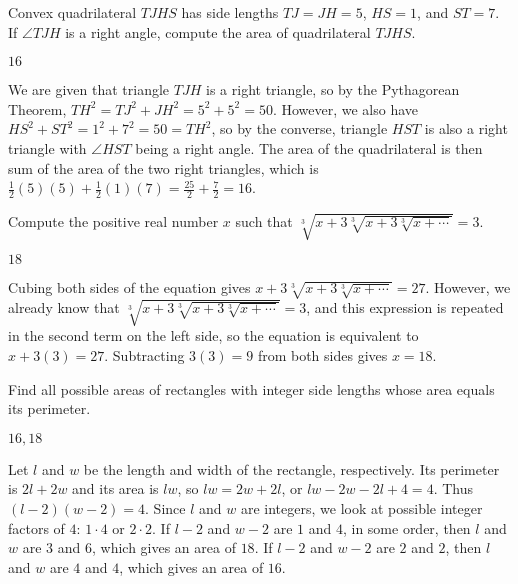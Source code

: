 \documentclass[11pt]{article}
\begin{document}
\begin{problem}%
Convex quadrilateral $TJHS$ has side lengths $TJ = JH = 5$, $HS = 1$, and $ST = 7$. If $\angle TJH$ is a right
angle, compute the area of quadrilateral $TJHS$.
\end{problem}

\begin{answer}
$\boxed{16}$
\end{answer}

\begin{solution}
We are given that triangle $TJH$ is a right triangle, so by the Pythagorean Theorem, 
$TH^2 = TJ^2 + JH^2 = 5^2 + 5^2 = 50$. However, we also have $HS^2 + ST^2 = 1^2 + 7^2 = 50 = TH^2$, 
so by the converse, triangle $HST$ is also a right triangle with $\angle HST$ being a right angle. 
The area of the quadrilateral is then sum of the area of the two right triangles, 
which is $\frac{1}{2}(5)(5) + \frac{1}{2}(1)(7) = \frac{25}{2} + \frac{7}{2} = \boxed{16}$.
\end{solution}


\begin{problem}%
Compute the positive real number $x$ such that $\sqrt[3]{x + 3\sqrt[3]{x + 3\sqrt[3]{x + \cdots}}} = 3$.
\end{problem}

\begin{answer}
$\boxed{18}$
\end{answer}

\begin{solution}
Cubing both sides of the equation gives $x + 3\sqrt[3]{x+3\sqrt[3]{x + \cdots}} = 27$.
However, we already know that $\sqrt[3]{x + 3\sqrt[3]{x + 3\sqrt[3]{x + \cdots}}} = 3$, and this expression 
is repeated in the second term on the left side, so the equation is equivalent to $x + 3(3) = 27$.
Subtracting $3(3) = 9$ from both sides gives $x = \boxed{18}$.
\end{solution}


\begin{problem}
Find all possible areas of rectangles with integer side lengths whose area equals its perimeter.
\end{problem}

\begin{answer}
$\boxed{16, 18}$
\end{answer}

\begin{solution}
Let $l$ and $w$ be the length and width of the rectangle, respectively. Its perimeter is
$2l + 2w$ and its area is $lw$, so $lw = 2w + 2l$, or $lw - 2w - 2l + 4 = 4$. Thus
$(l-2)(w-2) = 4$. Since $l$ and $w$ are integers, we look at possible integer factors
of $4$: $1 \cdot 4$ or $2 \cdot 2$. If $l-2$ and $w-2$ are $1$ and $4$, in some order,
then $l$ and $w$ are $3$ and $6$, which gives an area of $\boxed{18}$. If $l-2$
and $w-2$ are $2$ and $2$, then $l$ and $w$ are $4$ and $4$, which gives an area of $\boxed{16}$.
\end{solution}
\end{document}
